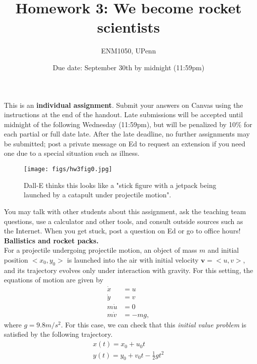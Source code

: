 \documentclass[12pt]{article}
\begin{document}
 
 
\title{Homework 3: We become rocket scientists}
\author{ENM1050, UPenn}
\date{Due date: September 30th by midnight (11:59pm)}
\maketitle

This is an \textbf{individual assignment}. Submit your answers on Canvas using the instructions at the end of the handout. Late submissions will be accepted until midnight of the following Wednesday (11:59pm), but will be penalized by 10\% for each partial or full date late. After the late deadline, no further assignments may be submitted; post a private message on Ed to request an extension if you need one due to a special situation such as illness. 

\begin{wrapfigure}{l}{0.45\textwidth}
    \texttt{[image: figs/hw3fig0.jpg]}
    \caption{Dall-E thinks this looks like a "stick figure with a jetpack being launched by a catapult under projectile motion".}
\end{wrapfigure}
You may talk with other students about this assignment, ask the teaching team questions, use a calculator and other tools, and consult outside sources such as the Internet. When you get stuck, post a question on Ed or go to office hours!\\

\noindent \textbf{Ballistics and rocket packs.}\\



For a projectile undergoing projectile motion, an object of mass $m$ and initial position $<x_0,y_0>$ is launched into the air with initial velocity $\mathbf{v}=<u,v>$, and its trajectory evolves only under interaction with gravity. For this setting, the equations of motion are given by
\begin{align}\label{projectile}
    \dot{x} &= u\\
    \dot{y} &= v\\
    m\dot{u} &= 0\\
    m\dot{v} &= -mg,
\end{align}
where $g = 9.8 m/s^2$. For this case, we can check that this \textit{initial value problem} is satisfied by the following trajectory.
\begin{align}\label{projectilesolution}
    x(t) = x_0 + u_0 t\\
    y(t) = y_0 + v_0 t - \frac12 g t^2
\end{align}
\newpage
\end{document}
